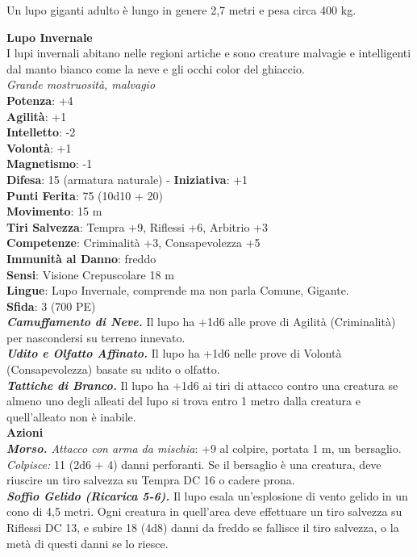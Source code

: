 \begin{multicols}{2}
Un lupo giganti adulto è lungo in genere 2,7 metri e pesa circa 400 kg. 

\medskip\textbf{Lupo Invernale}\\
I lupi invernali abitano nelle regioni artiche e sono creature malvagie e intelligenti dal manto bianco come la neve e gli occhi color del ghiaccio.\\
\emph{Grande mostruosità, malvagio}\\
\textbf{Potenza}: +4\\
\textbf{Agilità}: +1\\
\textbf{Intelletto}: -2\\
\textbf{Volontà}: +1\\
\textbf{Magnetismo}: -1\\
\textbf{Difesa}: 15 (armatura naturale) - \textbf{Iniziativa}: +1\\
\textbf{Punti Ferita}: 75 (10d10 + 20)\\
\textbf{Movimento}: 15 m\\
\textbf{Tiri Salvezza}: Tempra +9, Riflessi +6, Arbitrio +3 \\
\textbf{Competenze}: Criminalità +3, Consapevolezza +5\\
\textbf{Immunità al Danno}: freddo\\
\textbf{Sensi}: Visione Crepuscolare 18 m\\
\textbf{Lingue}:  Lupo Invernale, comprende ma non parla Comune, Gigante. \\
\textbf{Sfida}: 3 (700 PE)\smallskip\\
\emph{\textbf{Camuffamento di Neve.}} Il lupo ha +1d6 alle prove di Agilità (Criminalità) per nascondersi su terreno innevato.\\
\emph{\textbf{Udito e Olfatto Affinato.}} Il lupo ha +1d6 nelle prove di Volontà (Consapevolezza) basate su udito o olfatto.\\
\emph{\textbf{Tattiche di Branco.}} Il lupo ha +1d6 ai tiri di attacco contro una creatura se almeno uno degli alleati del lupo si trova entro 1 metro dalla creatura e quell'alleato non è inabile.\\
\smallskip\textbf{Azioni}\\
\emph{\textbf{Morso.} Attacco con arma da mischia}: +9 al colpire, portata 1 m, un bersaglio.\\
\emph{Colpisce:} 11 (2d6 + 4) danni perforanti. Se il bersaglio è una creatura, deve riuscire un tiro salvezza su Tempra DC  16 o cadere prona.\\
\emph{\textbf{Soffio Gelido (Ricarica 5-6).}} Il lupo esala un'esplosione di vento gelido in un cono di 4,5 metri. Ogni creatura in quell'area deve effettuare un tiro salvezza su Riflessi DC  13, e subire 18 (4d8) danni da freddo se fallisce il tiro salvezza, o la metà di questi danni se lo riesce. \\

\end{multicols}
